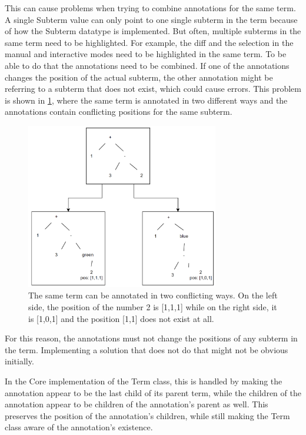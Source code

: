 This can cause problems when trying to combine annotations for the same term.
A single Subterm value can only point to one single subterm in the term because of how the Subterm datatype is implemented.
But often, multiple subterms in the same term need to be highlighted.
For example, the diff and the selection in the manual and interactive modes need to be highlighted in the same term.
To be able to do that the annotations need to be combined.
If one of the annotations changes the position of the actual subterm,
the other annotation might be referring to a subterm that does not exist, which could cause errors.
This problem is shown in \ref*{fig:highlightMismatch}, where the same term is annotated in two different ways and the annotations contain conflicting positions for the same subterm.

\begin{figure}[!ht]
    \includegraphics[width=0.75\textwidth]{resources/highlighting_mismatch.png}
    \caption{The same term can be annotated in two conflicting ways. On the left side, the position of the number 2 is [1,1,1] while on the right side, it is [1,0,1] and the position [1,1] does not exist at all.}
    \label{fig:highlightMismatch}
\end{figure}

For this reason, the annotations must not change the positions of any subterm in the term.
Implementing a solution that does not do that might not be obvious initially.

In the Core implementation of the Term class, this is handled by making the annotation appear to be the last child of its parent term,
while the children of the annotation appear to be children of the annotation's parent as well.
This preserves the position of the annotation's children, while still making the Term class aware of the annotation's existence.


